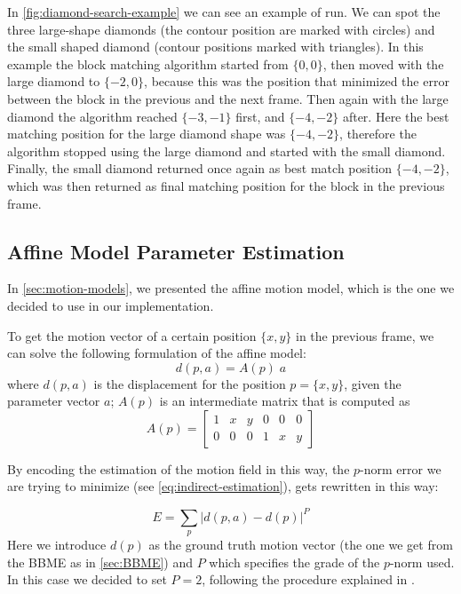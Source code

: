 In \cref{fig:diamond-search-example} we can see an example of run. We can spot the three large-shape diamonds (the contour position are marked with circles) and the small shaped diamond (contour positions marked with triangles).
In this example the block matching algorithm started from $\{0,0\}$, then moved with the large diamond to $\{-2,0\}$, because this was the position that minimized the error between the block in the previous and the next frame. Then again with the large diamond the algorithm reached $\{-3,-1\}$ first, and $\{-4,-2\}$ after. Here the best matching position for the large diamond shape was $\{-4,-2\}$, therefore the algorithm stopped using the large diamond and started with the small diamond. Finally, the small diamond returned once again as best match position $\{-4,-2\}$, which was then returned as final matching position for the block in the previous frame.

\subsection{Affine Model Parameter Estimation}
In \cref{sec:motion-models}, we presented the affine motion model, which is the one we decided to use in our implementation.

To get the motion vector of a certain position $\{x,y\}$ in the previous frame, we can solve the following formulation of the affine model:
\begin{equation}
    \label{eq:displacement-matrix-formulation}
    d(p, a) = A(p)\;a
\end{equation}
where $d(p, a)$ is the displacement for the position $p = \{x,y\}$, given the parameter vector $a$; $A(p)$ is an intermediate matrix that is computed as 
\begin{equation*}
    A(p) = \begin{bmatrix}
        1 & x & y & 0 & 0 & 0 \\
        0 & 0 & 0 & 1 & x & y
    \end{bmatrix}
\end{equation*}

By encoding the estimation of the motion field in this way, the $p$-norm error we are trying to minimize (see \cref{eq:indirect-estimation}), gets rewritten in this way:

\begin{equation}
    \label{eq:pnorm-error}
    E = \sum_p{\left| d(p, a) - d(p) \right|^P}
\end{equation}
Here we introduce $d(p)$ as the ground truth motion vector (the one we get from the BBME as in \cref{sec:BBME}) and $P$ which specifies the grade of the $p$-norm used. In this case we decided to set $P=2$, following the procedure explained in \cite{WangBook}.

